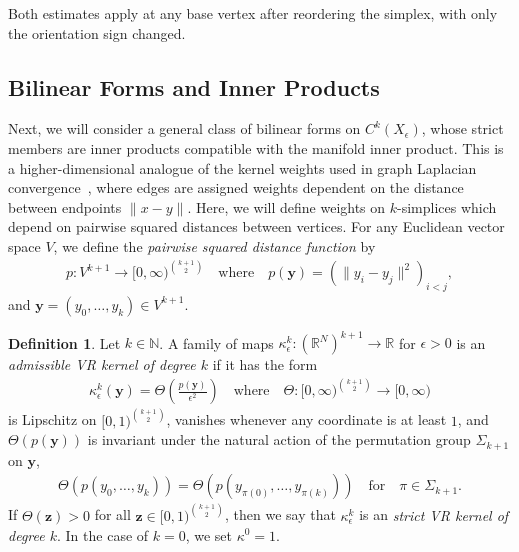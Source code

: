 \documentclass[11pt,reqno]{amsproc}
\numberwithin{equation}{section}
\newcommand{\N}{\mathbb{N}}
\newcommand{\R}{\mathbb{R}}
\newcommand{\by}{\mathbf{y}}
\newcommand{\bz}{\mathbf{z}}
\theoremstyle{definition}
\newtheorem{definition}[counter]{Definition}
\theoremstyle{plain}
\begin{document}
    Both estimates apply at any base vertex after reordering the simplex, with only the orientation sign changed. 


    \subsection{Bilinear Forms and Inner Products} \label{ssec:bilinear_forms}

    Next, we will consider a general class of bilinear forms on $C^k(X_\epsilon)$, whose strict members are inner products compatible with the manifold inner product. This is a higher-dimensional analogue of the kernel weights used in graph Laplacian convergence~\cite{coifman_diffusion_2006, garcia_trillos_error_2020,calder_improved_2022}, where edges are assigned weights dependent on the distance between endpoints $\|x - y\|$. Here, we will define weights on $k$-simplices which depend on pairwise squared distances between vertices. For any Euclidean vector space $V$, we define the \emph{pairwise squared distance function} by
    \begin{align}
        p: V^{k+1} \to [0,\infty)^{\binom{k+1}{2}} \quad \text{where} \quad p(\by) = (\|y_i - y_j\|^2)_{i < j},
    \end{align}
    and $\by = (y_0, \ldots, y_k) \in V^{k+1}$. 

    \begin{definition} \label{def:admissible_VR_kernel}
        Let $k \in \N$. A family of maps $\kappa_\epsilon^k : (\R^N)^{k+1} \to \R$ for $\epsilon > 0$ is an \emph{admissible VR kernel of degree $k$} if it has the form
        \begin{align}
            \kappa_\epsilon^k(\by) =  \Theta\left( \frac{p(\by)}{\epsilon^2} \right) \quad \text{where} \quad \Theta : [0,\infty)^{\binom{k+1}{2}} \to [0,\infty)
        \end{align}
        is Lipschitz on $[0,1)^{\binom{k+1}{2}}$, vanishes whenever any coordinate is at least $1$, and $\Theta(p(\by))$ is invariant under the natural action of the permutation group $\Sigma_{k+1}$ on $\by$,
        \begin{align}
            \Theta(p(y_0, \ldots, y_k)) = \Theta(p(y_{\pi(0)}, \ldots, y_{\pi(k)})) \quad \text{for} \quad \pi \in \Sigma_{k+1}.
        \end{align}
        If $\Theta(\bz) > 0$ for all $\bz \in [0,1)^{\binom{k+1}{2}}$, then we say that $\kappa_\epsilon^k$ is an \emph{strict VR kernel of degree $k$}. In the case of $k=0$, we set $\kappa^0 =1$. 
    \end{definition}
\end{document}

